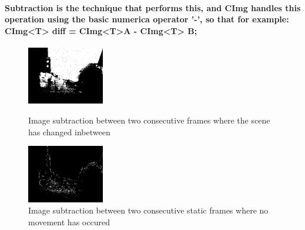 \documentclass[11pt]{article} %
\begin{document}
\paragraph{Subtraction is the technique that performs this, and CImg handles this operation using the basic numerica operator '-', so that for example: CImg<T> diff = CImg<T>A - CImg<T> B;
}
\begin{figure}
	\vspace{-20pt}
	\begin{center}
		\includegraphics[width=0.3\textwidth]{images/subG}
	\end{center}
	\vspace{-20pt}
	\caption{Image subtraction between two consecutive frames where the scene has changed inbetween}
	\vspace{10pt}
	\begin{center}
		\includegraphics[width=0.3\textwidth]{images/subF}
	\end{center}
	\vspace{-20pt}
	\caption{Image subtraction between two consecutive static frames where no movement has occured}
\end{figure}
\end{document}

